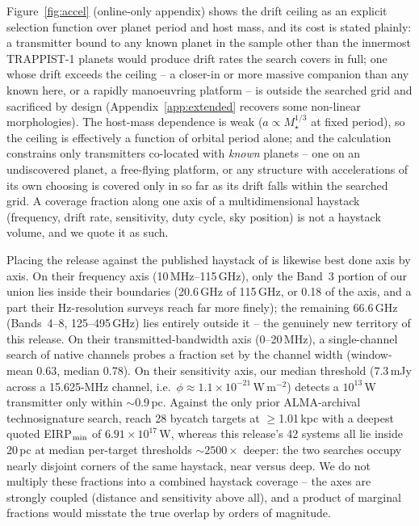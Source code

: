 \documentclass{openjournal}
\begin{document}
Figure~\ref{fig:accel} (online-only appendix) shows the drift ceiling
as an explicit selection function over planet period and host mass,
and its cost is stated plainly: a transmitter bound to any known
planet in the sample other than the innermost TRAPPIST-1 planets
would produce drift rates the search covers in full; one whose drift
exceeds the ceiling -- a closer-in or more massive companion than any
known here, or a rapidly manoeuvring platform -- is outside the
searched grid and sacrificed by design (Appendix~\ref{app:extended} recovers
some non-linear morphologies). The host-mass dependence is weak
($a \propto M_\star^{1/3}$ at fixed period), so the ceiling is
effectively a function of orbital period alone; and the calculation
constrains only transmitters co-located with \emph{known} planets --
one on an undiscovered planet, a free-flying platform, or any
structure with accelerations of its own choosing is covered only in
so far as its drift falls within the searched grid. A coverage
fraction along one axis of a multidimensional haystack (frequency,
drift rate, sensitivity, duty cycle, sky position) is not a haystack
volume, and we quote it as such.

Placing the release against the published haystack of
\citet{Wright2018} is likewise best done axis by axis. On their
frequency axis (10\,MHz--115\,GHz), only the Band~3 portion of our
union lies inside their boundaries (20.6\,GHz of 115\,GHz, or 0.18 of
the axis, and a part their Hz-resolution surveys reach far more
finely); the remaining 66.6\,GHz (Bands~4--8, 125--495\,GHz) lies
entirely outside it -- the genuinely new territory of this release.
On their transmitted-bandwidth axis (0--20\,MHz), a single-channel
search of native channels probes a fraction set by the channel width
(window-mean 0.63, median 0.78). On their sensitivity axis, our
median threshold ($7.3$\,mJy across a 15.625-MHz channel, i.e.\
$\phi\approx1.1\times10^{-21}$\,W\,m$^{-2}$) detects a $10^{13}$\,W
transmitter only within ${\sim}0.9$\,pc. Against the only prior
ALMA-archival technosignature search, \citet{Mason2024} reach 28
bycatch targets at $\geq$1.01\,kpc with a deepest quoted
EIRP$_{\rm min}$ of $6.91\times10^{17}$\,W, whereas this release's 42
systems all lie inside 20\,pc at median per-target thresholds
${\sim}2500\times$ deeper: the two searches occupy nearly disjoint
corners of the same haystack, near versus deep. We do not multiply
these fractions into a combined haystack coverage -- the axes are
strongly coupled (distance and sensitivity above all), and a product
of marginal fractions would misstate the true overlap by orders of
magnitude.
\end{document}
